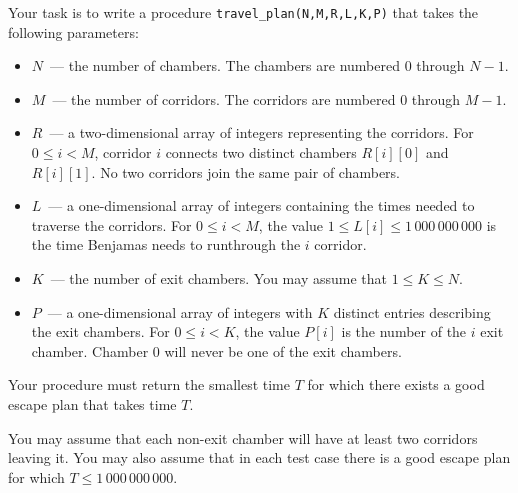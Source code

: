 Your task is to write a procedure \texttt{travel\_plan(N,M,R,L,K,P)} that takes the following parameters:
\begin{itemize}
\item $N$~--- the number of chambers. The chambers are numbered $0$ through $N-1$.
\item $M$~--- the number of corridors. The corridors are numbered $0$ through $M-1$.
\item $R$~--- a two-dimensional array of integers representing the corridors. For $0 \le i < M$, corridor $i$ connects two distinct chambers $R[i][0]$ and $R[i][1]$. No two corridors join the same pair of chambers.
\item $L$~--- a one-dimensional array of integers containing the times needed to traverse the corridors. For $0 \le i < M$, the value $1 \le L[i] \le 1\,000\,000\,000$ is the time Benjamas needs to runthrough the $i$ corridor.
\item $K$~--- the number of exit chambers. You may assume that $1 \le K \le N$.
\item $P$~--- a one-dimensional array of integers with $K$ distinct entries describing the exit chambers. For $0 \le i < K$, the value $P[i]$ is the number of the $i$ exit chamber. Chamber $0$ will never be one of the exit chambers.
\end{itemize}
Your procedure must return the smallest time $T$ for which there exists a good escape plan that
takes time $T$.

You may assume that each non-exit chamber will have at least two corridors leaving it. You may
also assume that in each test case there is a good escape plan for which $T \le 1\,000\,000\,000$.